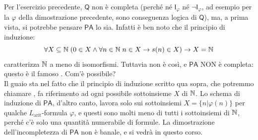 Per l'esercizio precedente, $\mathsf{Q}$ non è completa (perché né $\mathsf{I}_\varphi$ né $\neg\mathsf{I}_\varphi$, ad esempio per la $\varphi$ della dimostrazione precedente, sono conseguenza logica di $\mathsf{Q}$),
ma, a prima vista, si potrebbe pensare $\mathsf{PA}$ lo sia. Infatti è ben noto che il principio di induzione:
\[ \forall X \subseteq \mathbb N \; (0 \in X \land \forall n \in \mathbb N \; n \in X \to s(n) \in X) \to X = \mathbb N
\]
caratterizza $\mathbb N$ a meno di isomorfismi. Tuttavia non è così, e $\mathsf{PA}$ NON è completa: questo è il famoso . Com'è possibile?\\
Il guaio sta nel fatto che il principio di induzione scritto qua sopra, che potremmo chiamare , fa riferimento ad ogni possibile sottoinsieme $X$ di $\mathbb N$.
Lo schema di induzione di $\mathsf{PA}$, d'altro canto, lavora solo sui sottoinsiemi $X = \{n| \varphi(n)\}$ per qualche $L_{\text{arit}}$-formula $\varphi$, e questi sono molti meno di tutti i
sottoinsiemi di $\mathbb N$, perché c'è solo una quantità numerabile di formule. La dimostrazione dell'incompletezza di $\mathsf{PA}$ non è banale, e si vedrà in questo corso.